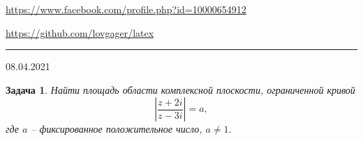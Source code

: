 \documentclass[12pt]{article}
\begin{document}


\begin{flushleft}
\url{https://www.facebook.com/profile.php?id=10000654912}

\url{https://github.com/lovgager/latex}
\end{flushleft}
\hrule 
\begin{flushright}
08.04.2021
\end{flushright}
\bigskip


\newtheorem*{task}{Задача}
\begin{task}
Найти площадь области комплексной плоскости, ограниченной кривой
\begin{equation}\label{main}
    \left|\frac{z+2i}{z-3i}\right| = a, 
\end{equation}
где $a$ -- фиксированное положительное число, $a \neq 1.$
\end{task}
\end{document}
